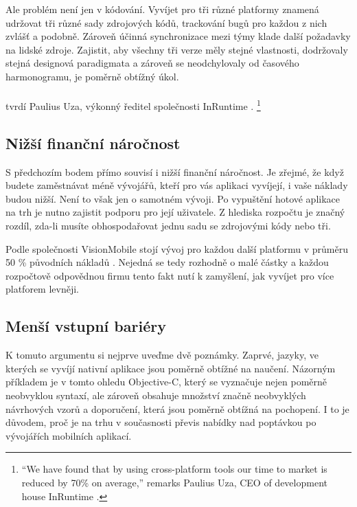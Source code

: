 Ale problém není jen v kódování. Vyvíjet pro tři různé platformy znamená udržovat tři různé sady zdrojových kódů, trackování bugů pro každou z nich zvlášť a podobně. Zároveň účinná synchronizace mezi týmy klade další požadavky na lidské zdroje. Zajistit, aby všechny tři verze měly stejné vlastnosti, dodržovaly stejná designová paradigmata a zároveň se neodchylovaly od časového harmonogramu, je poměrně obtížný úkol.
\\ \\
\textit{} tvrdí Paulius Uza, výkonný ředitel společnosti InRuntime \cite{visionmobile_survey}.
\footnote{“We have found that by using cross-platform tools our time to market is reduced by 70\% on average,” remarks Paulius Uza, CEO of development house InRuntime \cite{visionmobile_survey}.}	

\subsection{Nižší finanční náročnost}
S předchozím bodem přímo souvisí i nižší finanční náročnost. Je zřejmé, že když budete zaměstnávat méně vývojářů, kteří pro vás aplikaci vyvíjejí, i vaše náklady budou nižší. Není to však jen o samotném vývoji. Po vypuštění hotové aplikace na trh je nutno zajistit podporu pro její uživatele. Z hlediska rozpočtu je značný rozdíl, zda-li musíte obhospodařovat jednu sadu se zdrojovými kódy nebo tři.

Podle společnosti VisionMobile stojí vývoj pro každou další platformu v průměru 50 \% původních nákladů \cite{visionmobile_survey}. Nejedná se tedy rozhodně o malé částky a každou rozpočtově odpovědnou firmu tento fakt nutí k zamyšlení, jak vyvíjet pro více platforem levněji.

\subsection{Menší vstupní bariéry}
K tomuto argumentu si nejprve uveďme dvě poznámky. Zaprvé, jazyky, ve kterých se vyvíjí nativní aplikace jsou poměrně obtížné na naučení. Názorným příkladem je v tomto ohledu Objective-C, který se vyznačuje nejen poměrně neobvyklou syntaxí, ale zároveň obsahuje množství značně neobvyklých návrhových vzorů a doporučení, která jsou poměrně obtížná na pochopení. I to je důvodem, proč je na trhu v současnosti převis nabídky nad poptávkou po vývojářích mobilních aplikací.

